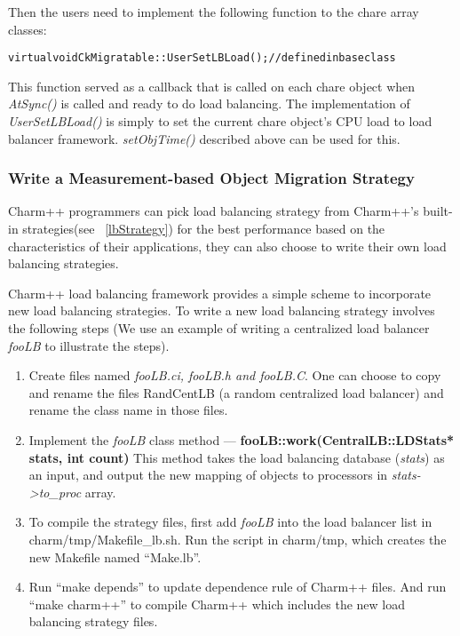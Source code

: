 Then the users need to implement the following function to the chare array
classes:

\begin{alltt}
   virtual void CkMigratable::UserSetLBLoad();      // defined in base class
\end{alltt}

This function served as a callback that is called on each chare object when
{\em AtSync()} is called and ready to do load balancing. The implementation of
{\em UserSetLBLoad()} is simply to set the current chare object's CPU load to
load balancer framework. {\em setObjTime()} described above can be used for
this.

\subsubsection{Write a Measurement-based Object Migration Strategy}
\label{writelb}

Charm++ programmers can pick load balancing strategy from Charm++'s built-in
strategies(see ~\ref{lbStrategy}) for the best performance based on the 
characteristics of their applications, they can also choose to write their 
own load balancing strategies.

Charm++ load balancing framework provides a simple scheme to incorporate new 
load balancing strategies. To write a new load balancing strategy
involves the following steps (We use an example of writing a centralized
load balancer {\em fooLB} to illustrate the steps).

\begin{enumerate}
\item Create files named {\em fooLB.ci, fooLB.h and fooLB.C}. One can choose to
copy and rename the files RandCentLB (a random centralized load balancer) and 
rename the class name in those files.

\item Implement the {\em fooLB} class method --- 
{\bf fooLB::work(CentralLB::LDStats* stats, int count)} 
This method takes the load balancing database ({\em stats}) as an input,
and output the new mapping of objects to processors in {\em stats->to\_proc} array.

\item To compile the strategy files, first add {\em fooLB} into the load 
balancer list in charm/tmp/Makefile\_lb.sh. Run the script in charm/tmp, 
which creates the new Makefile named ``Make.lb''.

\item Run ``make depends'' to update dependence rule of Charm++ files.
   And run ``make charm++'' to compile Charm++ which includes the new 
load balancing strategy files.
\end{enumerate}


